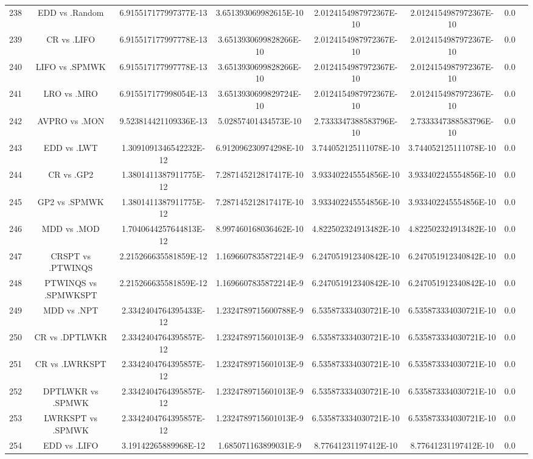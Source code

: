 \documentclass[a3paper,10pt]{article}
\begin{document}
\begin{table}[!htp]
\begin{tabular}{cccccccc}
238&EDD vs .Random&6.915517177997377E-13&3.651393069982615E-10&2.0124154987972367E-10&2.0124154987972367E-10&0.0\\
239&CR vs .LIFO&6.915517177997778E-13&3.6513930699828266E-10&2.0124154987972367E-10&2.0124154987972367E-10&0.0\\
240&LIFO vs .SPMWK&6.915517177997778E-13&3.6513930699828266E-10&2.0124154987972367E-10&2.0124154987972367E-10&0.0\\
241&LRO vs .MRO&6.915517177998054E-13&3.6513930699829724E-10&2.0124154987972367E-10&2.0124154987972367E-10&0.0\\
242&AVPRO vs .MON&9.523814421109336E-13&5.02857401434573E-10&2.7333347388583796E-10&2.7333347388583796E-10&0.0\\
243&EDD vs .LWT&1.3091091346542232E-12&6.912096230974298E-10&3.744052125111078E-10&3.744052125111078E-10&0.0\\
244&CR vs .GP2&1.3801411387911775E-12&7.287145212817417E-10&3.933402245554856E-10&3.933402245554856E-10&0.0\\
245&GP2 vs .SPMWK&1.3801411387911775E-12&7.287145212817417E-10&3.933402245554856E-10&3.933402245554856E-10&0.0\\
246&MDD vs .MOD&1.7040644257644813E-12&8.997460168036462E-10&4.822502324913482E-10&4.822502324913482E-10&0.0\\
247&CRSPT vs .PTWINQS&2.215266635581859E-12&1.1696607835872214E-9&6.247051912340842E-10&6.247051912340842E-10&0.0\\
248&PTWINQS vs .SPMWKSPT&2.215266635581859E-12&1.1696607835872214E-9&6.247051912340842E-10&6.247051912340842E-10&0.0\\
249&MDD vs .NPT&2.3342404764395433E-12&1.2324789715600788E-9&6.535873334030721E-10&6.535873334030721E-10&0.0\\
250&CR vs .DPTLWKR&2.3342404764395857E-12&1.2324789715601013E-9&6.535873334030721E-10&6.535873334030721E-10&0.0\\
251&CR vs .LWRKSPT&2.3342404764395857E-12&1.2324789715601013E-9&6.535873334030721E-10&6.535873334030721E-10&0.0\\
252&DPTLWKR vs .SPMWK&2.3342404764395857E-12&1.2324789715601013E-9&6.535873334030721E-10&6.535873334030721E-10&0.0\\
253&LWRKSPT vs .SPMWK&2.3342404764395857E-12&1.2324789715601013E-9&6.535873334030721E-10&6.535873334030721E-10&0.0\\
254&EDD vs .LIFO&3.19142265889968E-12&1.685071163899031E-9&8.77641231197412E-10&8.77641231197412E-10&0.0\\

\end{tabular}
\end{table}
\end{document}
